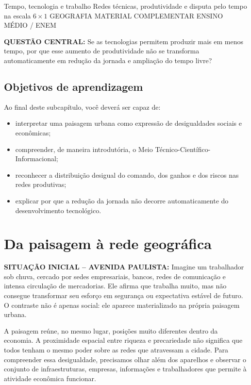 \abresubcapitulo
  {Tempo, tecnologia e trabalho}
  {Redes técnicas, produtividade e disputa pelo tempo na escala $6\times1$}
  {GEOGRAFIA \;\textbullet\; MATERIAL COMPLEMENTAR \;\textbullet\; ENSINO MÉDIO / ENEM}

\begin{questaocentral}
\textbf{QUESTÃO CENTRAL:} Se as tecnologias permitem produzir mais em menos tempo, por que esse aumento de produtividade não se transforma automaticamente em redução da jornada e ampliação do tempo livre?
\end{questaocentral}

\subsection*{Objetivos de aprendizagem}

Ao final deste subcapítulo, você deverá ser capaz de:

\begin{itemize}
  \item interpretar uma paisagem urbana como expressão de desigualdades sociais e econômicas;
  \item compreender, de maneira introdutória, o Meio Técnico-Científico-Informacional;
  \item reconhecer a distribuição desigual do comando, dos ganhos e dos riscos nas redes produtivas;
  \item explicar por que a redução da jornada não decorre automaticamente do desenvolvimento tecnológico.
\end{itemize}

\section{Da paisagem à rede geográfica}

\begin{exemploconcreto}
\textbf{SITUAÇÃO INICIAL -- AVENIDA PAULISTA:} Imagine um trabalhador sob chuva, cercado por sedes empresariais, bancos, redes de comunicação e intensa circulação de mercadorias. Ele afirma que trabalha muito, mas não consegue transformar seu esforço em segurança ou expectativa estável de futuro. O contraste não é apenas social: ele aparece materializado na própria paisagem urbana.
\end{exemploconcreto}

A paisagem reúne, no mesmo lugar, posições muito diferentes dentro da economia. A proximidade espacial entre riqueza e precariedade não significa que todos tenham o mesmo poder sobre as redes que atravessam a cidade. Para compreender essa desigualdade, precisamos olhar além dos aparelhos e observar o conjunto de infraestruturas, empresas, informações e trabalhadores que permite à atividade econômica funcionar.

